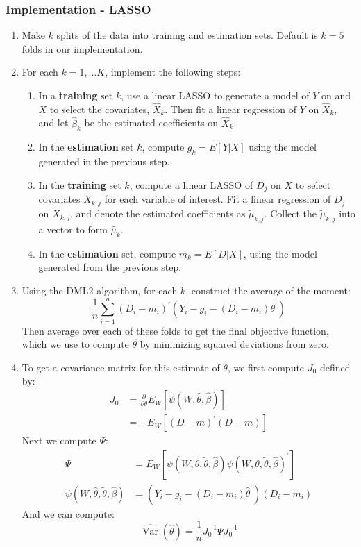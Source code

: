 \documentclass[11pt]{article}
\begin{document}
\subsubsection{Implementation - LASSO}
\begin{enumerate}
	\item Make $k$  splits of the data into training and estimation sets. Default is $k = 5$ folds in our implementation.
	\item For each $k = 1, ... K$, implement the following steps:
  \begin{enumerate}
    \item In a \textbf{training} set $k$, use a linear LASSO to generate a model of  $Y$ on and $X$ to select the covariates, $\hat{X}_k$. Then fit a linear regression of $Y$ on $\hat{X}_k$, and let $\hat{\beta}_k$ be the estimated coefficients on $\hat{X}_k$.
  	\item In the \textbf{estimation} set $k$, compute $g_k = E[Y|X]$ using the model generated in the previous step.
  	\item In the \textbf{training} set $k$, compute a linear LASSO of $D_j$ on $X$ to select covariates $\tilde{X}_{k,j}$ for each variable of interest. Fit a linear regression of $D_j$ on $\tilde{X}_{k,j}$, and denote the estimated coefficients as $\tilde{\mu}_{k,j}$. Collect the $\tilde{\mu}_{k,j}$ into a vector to form $\tilde{\mu_k}$.
  	\item In the \textbf{estimation} set, compute $m_k = E[D|X]$, using the model generated from the previous step.
  \end{enumerate}
	\item Using the DML2 algorithm, for each $k$, construct the average of the moment:
	$$\frac{1}{n} \sum_{i=1}^{n} (D_i - m_{i})^\prime\left({Y}_{i}- g_i -(D_{i} - m_i) \theta^{\prime}\right)$$
	Then average over each of these folds to get the final objective function, which we use to compute $\hat{\theta}$ by minimizing squared deviations from zero.
	\item To get a covariance matrix for this estimate of $\theta$, we first compute $J_0$ defined by:
	$$
	\begin{aligned}
	J_{0} &=\frac{\partial}{\partial \theta} E_{W}\left[ \psi(W, \hat{\theta}, \hat{\beta}) \right]\\
	&=-E_{W}\left[(D-m)^{\prime} (D-m)\right]
	\end{aligned}$$
	Next we compute $\Psi:$
	$$
	\begin{aligned}
	\Psi &=E_{W}\left[\psi(W, \theta, \tilde{\theta}, \hat{\beta}) \psi(W, \theta, \tilde{\theta}, \hat{\beta})^{\prime}\right] \\
	\psi(W, \hat{\theta}, \tilde{\theta}, \hat{\beta}) &= (Y_{i}- g_i - (D_{i} - m_i)\hat{\theta}^{\prime}) (D_i - m_i)
	\end{aligned}
	$$
	And we can compute:
	$$\hat{\operatorname{Var}}(\hat{\theta})=\frac{1}{n} J_{0}^{-1} \Psi J_{0}^{-1}$$
\end{enumerate}
\end{document}
